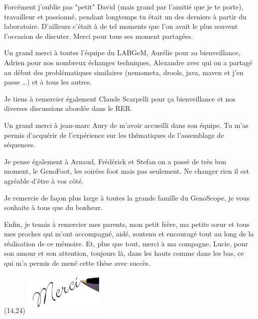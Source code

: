     Forcément j'oublie pas "petit" David (mais grand par l'amitié que je te porte), travailleur et passionné, pendant longtemps tu était un des derniers à partir du laboratoire. D'ailleurs c'était à de tel moments que l'on avait le plus souvent l'occasion de discuter. Merci pour tous ses moment partagées.
    
    Un grand merci à toutes l'équipe du LABGeM, Aurélie pour sa bienveillance, Adrien pour nos nombreux échanges techniques, Alexandre avec qui on a partagé au début des problématiques similaires (nemometa, drools, java, maven et j'en passe \ldots) et à tous les autres.
    
    Je tiens à remercier également Claude Scarpelli pour ça bienveillance et nos diverses discussions abordée dans le RER.
    
    Un grand merci à jean-marc Aury de m'avoir accueilli dans son équipe. Tu m'as permis d'acquérir de l'expérience sur les thématiques de l'assemblage de séquences.
    
    Je pense également à Arnaud, Frédérick et Stefan on a passé de très bon moment, le GenoFoot, les soirées foot mais pas seulement. Ne changer rien il est agréable d'être à vos côté.
    
    Je remercie de façon plus large à toutes la grande famille du GenoScope, je vous souhaite à tous que du bonheur.
    
    Enfin, je tenais à remercier mes parents, mon petit frère, ma petite sœur et tous mes proches qui m'ont accompagné, aidé, soutenu et encouragé tout au long de la réalisation de ce mémoire. Et, plus que tout, merci à ma compagne, Lucie, pour son amour et son attention, toujours là, dans les hauts comme dans les bas, ce qui m'a permis de mené cette thèse avec succès.

\begin{textblock}{3}(14,24)
    \includegraphics[height=2cm]{img/merci.jpg}
\end{textblock}

\normalFont